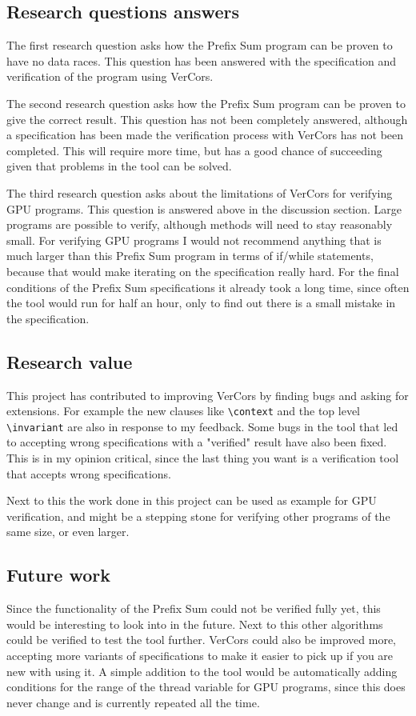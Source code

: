 \documentclass[a4paper]{article}
\newcommand{\code}[1]{\texttt{\small \color{inline}#1}} %
\begin{document}
\subsection{Research questions answers}
The first research question asks how the Prefix Sum program can be proven to have no data races. This question has been answered with the specification and verification of the program using VerCors.

The second research question asks how the Prefix Sum program can be proven to give the correct result. This question has not been completely answered, although a specification has been made the verification process with VerCors has not been completed. This will require more time, but has a good chance of succeeding given that problems in the tool can be solved.

The third research question asks about the limitations of VerCors for verifying GPU programs. This question is answered above in the discussion section. Large programs are possible to verify, although methods will need to stay reasonably small. For verifying GPU programs I would not recommend anything that is much larger than this Prefix Sum program in terms of if/while statements, because that would make iterating on the specification really hard. For the final conditions of the Prefix Sum specifications it already took a long time, since often the tool would run for half an hour, only to find out there is a small mistake in the specification.

\subsection{Research value}
This project has contributed to improving VerCors by finding bugs and asking for extensions. For example the new clauses like \code{\textbackslash context} and the top level \code{\textbackslash invariant} are also in response to my feedback. Some bugs in the tool that led to accepting wrong specifications with a "verified" result have also been fixed. This is in my opinion critical, since the last thing you want is a verification tool that accepts wrong specifications.

Next to this the work done in this project can be used as example for GPU verification, and might be a stepping stone for verifying other programs of the same size, or even larger.

\subsection{Future work}
Since the functionality of the Prefix Sum could not be verified fully yet, this would be interesting to look into in the future. Next to this other algorithms could be verified to test the tool further. VerCors could also be improved more, accepting more variants of specifications to make it easier to pick up if you are new with using it. A simple addition to the tool would be automatically adding conditions for the range of the thread variable for GPU programs, since this does never change and is currently repeated all the time.
\end{document}
